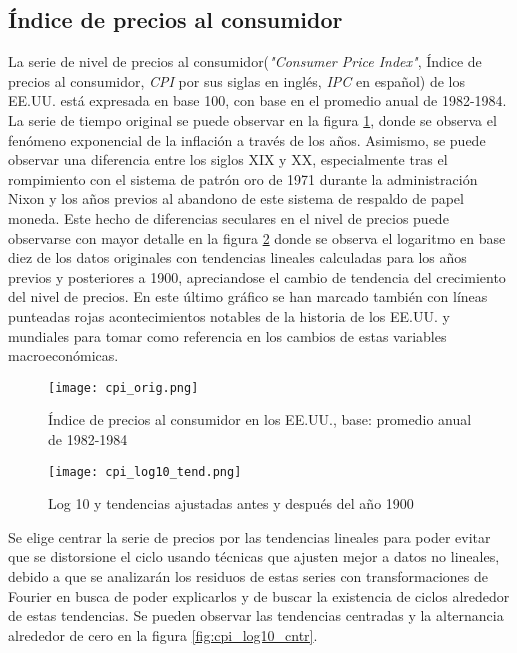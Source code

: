\documentclass[a4paper]{article}
\begin{document}
\subsection{Índice de precios al consumidor}
La serie de nivel de precios al consumidor(\textit{"Consumer Price Index"}, Índice de precios al consumidor, \textit{CPI} por sus siglas en inglés, \textit{IPC} en español) de los EE.UU. está expresada en base 100, con base en el promedio anual de 1982-1984. La serie de tiempo original se puede observar en la figura \ref{fig:cpi_orig}, donde se observa el fenómeno exponencial de la inflación a través de los años. Asimismo, se puede observar una diferencia entre los siglos XIX y XX, especialmente tras el rompimiento con el sistema de patrón oro de 1971 durante la administración Nixon y los años previos al abandono de este sistema de respaldo de papel moneda. Este hecho de diferencias seculares en el nivel de precios puede observarse con mayor detalle en la figura \ref{fig:cpi_log10_tend} donde se observa el logaritmo en base diez de los datos originales con tendencias lineales calculadas para los años previos y posteriores a 1900, apreciandose el cambio de tendencia del crecimiento del nivel de precios. En este último gráfico se han marcado también con líneas punteadas rojas acontecimientos notables de la historia de los EE.UU. y mundiales para tomar como referencia en los cambios de estas variables macroeconómicas.

\begin{figure}[H]
	\centering
	\texttt{[image: cpi\_orig.png]}
	\caption{Índice de precios al consumidor en los EE.UU., base: promedio anual de 1982-1984} 	
	\label{fig:cpi_orig}
\end{figure}

\begin{figure}[H]
	\centering
	\texttt{[image: cpi\_log10\_tend.png]}
	\caption{Log 10 y tendencias ajustadas antes y después del año 1900} 	
	\label{fig:cpi_log10_tend}
\end{figure}

Se elige centrar la serie de precios por las tendencias lineales para poder evitar que se distorsione el ciclo usando técnicas que ajusten mejor a datos no lineales, debido a que se analizarán los residuos de estas series con transformaciones de Fourier en busca de poder explicarlos y de buscar la existencia de ciclos alrededor de estas tendencias. Se pueden observar las tendencias centradas y la alternancia alrededor de cero en la figura \ref{fig:cpi_log10_cntr}.
\end{document}
